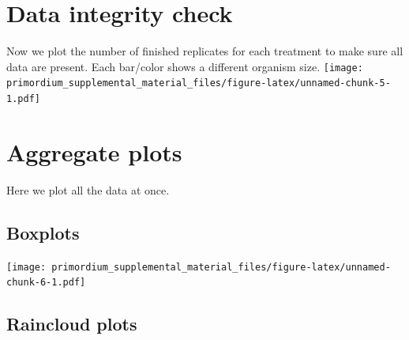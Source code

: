 \documentclass[]{book}
\newenvironment{Shaded}{\begin{snugshade}}{\end{snugshade}}
\newcommand{\CommentTok}[1]{\textcolor[rgb]{0.56,0.35,0.01}{\textit{#1}}}
\newcommand{\DecValTok}[1]{\textcolor[rgb]{0.00,0.00,0.81}{#1}}
\newcommand{\KeywordTok}[1]{\textcolor[rgb]{0.13,0.29,0.53}{\textbf{#1}}}
\newcommand{\NormalTok}[1]{#1}
\newcommand{\StringTok}[1]{\textcolor[rgb]{0.31,0.60,0.02}{#1}}
\begin{document}
\begin{Shaded}
\end{Shaded}

\hypertarget{data-integrity-check}{%
\section{Data integrity check}\label{data-integrity-check}}

Now we plot the number of finished replicates for each treatment to make sure all data are present.
Each bar/color shows a different organism size.
\texttt{[image: primordium\_supplemental\_material\_files/figure-latex/unnamed-chunk-5-1.pdf]}

\hypertarget{aggregate-plots}{%
\section{Aggregate plots}\label{aggregate-plots}}

Here we plot all the data at once.

\hypertarget{boxplots}{%
\subsection{Boxplots}\label{boxplots}}

\texttt{[image: primordium\_supplemental\_material\_files/figure-latex/unnamed-chunk-6-1.pdf]}

\hypertarget{raincloud-plots}{%
\subsection{Raincloud plots}\label{raincloud-plots}}
\end{document}
